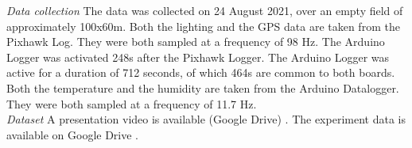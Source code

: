 \textit{Data collection} \hspace{0.3cm} The data was collected on 24 August 2021, over an empty field of approximately 100x60m. Both the lighting and the GPS data are taken from the Pixhawk Log. They were both sampled at a frequency of 98 Hz. The Arduino Logger was activated  248s after the Pixhawk Logger. The Arduino Logger was active for a duration of 712 seconds, of which 464s are common to both boards. Both the temperature and the humidity are taken from the Arduino Datalogger. They were both sampled at a frequency of 11.7 Hz.\\

\textit{Dataset} \hspace{0.3cm}  A presentation video is available (Google Drive) \cite{fieldscan_video}. The experiment data is available on Google Drive \cite{fieldscan_dataset}.





        
    

    
